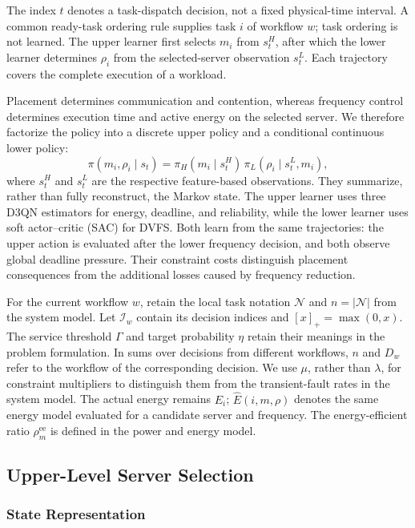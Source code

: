 \documentclass[10pt,twocolumn]{article}
\begin{document}
The index $t$ denotes a task-dispatch decision, not a fixed physical-time
interval. A common ready-task ordering rule supplies task $i$ of workflow
$w$; task ordering is not learned. The upper learner first selects $m_i$
from $s_t^H$, after which the lower learner determines $\rho_i$ from the
selected-server observation $s_t^L$. Each trajectory covers the complete
execution of a workload.

Placement determines communication and contention, whereas frequency
control determines execution time and active energy on the selected
server. We therefore factorize the policy into a discrete upper policy
and a conditional continuous lower policy:
\begin{equation}
 \pi(m_i,\rho_i\mid s_t)
 =\pi_H(m_i\mid s_t^H)\,
   \pi_L(\rho_i\mid s_t^L,m_i),
 \label{eq:method_factorization}
\end{equation}
where $s_t^H$ and $s_t^L$ are the respective feature-based observations.
They summarize, rather than fully reconstruct, the Markov state.
The upper learner uses three D3QN estimators for energy, deadline, and
reliability, while the lower learner uses soft actor--critic (SAC) for
DVFS. Both learn from the same trajectories: the upper action is evaluated
after the lower frequency decision, and both observe global deadline
pressure. Their constraint costs distinguish placement consequences from
the additional losses caused by frequency reduction.

For the current workflow $w$, retain the local task notation
$\mathcal N$ and $n=|\mathcal N|$ from the system model. Let
$\mathcal I_w$ contain its decision indices and $[x]_+=\max(0,x)$.
The service threshold $\Gamma$ and target probability $\eta$ retain
their meanings in the problem formulation.
In sums over decisions from different workflows, $n$ and $D_w$ refer
to the workflow of the corresponding decision.
We use $\mu$, rather than $\lambda$, for constraint multipliers to
distinguish them from the transient-fault rates in the system model.
The actual energy remains $E_i$; $\widehat E(i,m,\rho)$ denotes the same
energy model evaluated for a candidate server and frequency. The
energy-efficient ratio $\rho_m^{\mathrm{ee}}$ is defined in the power and
energy model.

\subsection{Upper-Level Server Selection}
\label{subsec:high}

\subsubsection{State Representation}
\end{document}
